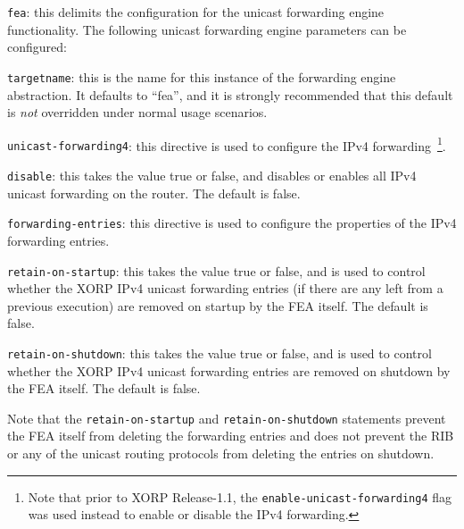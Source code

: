 \begin{description}
\item{\tt fea}: this delimits the configuration for the unicast
  forwarding engine functionality. 
  The following unicast forwarding engine parameters can be configured:
\begin{description}
\item{\tt targetname}: this is the name for this instance of the
  forwarding engine abstraction.  It defaults to ``{\stt fea}'', and
  it is strongly recommended that this default is {\it not} overridden
  under normal usage scenarios.
\end{description}

\item{\tt unicast-forwarding4}: this directive is used to configure the IPv4
  forwarding~\footnote{Note that prior to XORP Release-1.1, the
  {\tt enable-unicast-forwarding4} flag was used instead to enable or disable
  the IPv4 forwarding.}.
\begin{description}
\item{\tt disable}: this takes the value {\stt true} or {\stt false},
  and disables or enables all IPv4 unicast forwarding on the router.
  The default is {\stt false}.
\item{\tt forwarding-entries}: this directive is used to configure the
  properties of the IPv4 forwarding entries.
\begin{description}
\item{\tt retain-on-startup}: this takes the value {\stt true} or
  {\stt false}, and is used to control whether the XORP IPv4 unicast
  forwarding entries (if there are any left from a previous execution)
  are removed on startup by the FEA itself. The default is {\stt false}.
\item{\tt retain-on-shutdown}: this takes the value {\stt true} or
  {\stt false}, and is used to control whether the XORP IPv4 unicast
  forwarding entries are removed on shutdown by the FEA itself.
  The default is {\stt false}.
\end{description}
   Note that the {\tt retain-on-startup} and {\tt retain-on-shutdown}
   statements prevent the FEA itself from deleting the forwarding
   entries and does not prevent the RIB or any of the unicast routing
   protocols from deleting the entries on shutdown.
\end{description}


\end{description}
